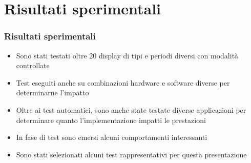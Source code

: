 \documentclass[xcolor={x11names}]{beamer}
\begin{document}
\section{Risultati sperimentali}
\begin{frame}
	\frametitle{Risultati sperimentali}
	\begin{itemize}
		\item Sono stati testati \alert{oltre 20 display di tipi e periodi diversi} con modalità controllate
		\item Test eseguiti anche su \alert{combinazioni hardware e software diverse} per determinarne l'impatto
		\item Oltre ai test automatici, sono anche state \alert{testate diverse applicazioni} per determinare quanto l'implementazione impatti le prestazioni
		\item In fase di test sono emersi \alert{alcuni comportamenti interessanti}
		\item Sono stati selezionati alcuni test rappresentativi per questa presentazione
	\end{itemize}
\end{frame}
\end{document}
